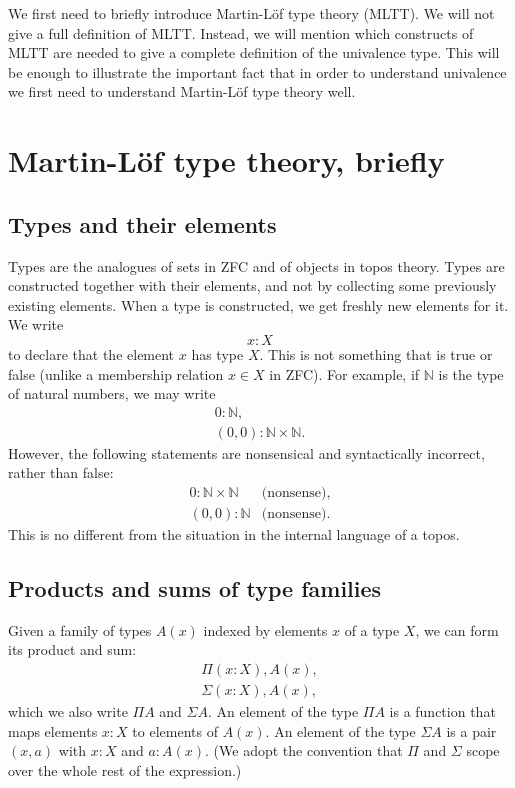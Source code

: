 \documentclass{article}
\newcommand{\N}{\mathbb{N}}
\begin{document}
We first need to briefly introduce Martin-L\"of type theory (MLTT). We
will not give a full definition of MLTT. Instead, we will mention
which constructs of MLTT are needed to give a complete definition of
the univalence type. This will be enough to illustrate the important
fact that in order to understand univalence we first need to
understand Martin-L\"of type theory well.

\section{Martin-L\"of type theory, briefly}

\subsection{Types and their elements}

Types are the analogues of sets in ZFC and of objects in topos theory.
%
Types are constructed together with their elements, and not by
collecting some previously existing elements. When a type is
constructed, we get freshly new elements for it. We write
\[
    x:X
\]
to declare that the element $x$ has type $X$. This is not something
that is true or false (unlike a membership relation $x \in X$ in
ZFC). For example, if $\N$ is the type of natural numbers, we may
write
\begin{gather*}  
    0 : \N, \\
   (0,0) : \N \times  \N.
\end{gather*}
However, the following statements are nonsensical and syntactically
incorrect, rather than false:
\begin{eqnarray*}
    0 : \N \times  \N & \text{(nonsense)}, \\
   (0,0) : \N & \text{(nonsense)}.  
\end{eqnarray*}
This is no different from the situation in the internal language of a
topos.

\subsection{Products and sums of type families}

Given a family of types $A(x)$ indexed by elements $x$ of a type $X$, we can
form its product and sum:
\begin{gather*}
    \Pi(x:X), A(x), \\
    \Sigma(x:X), A(x),  
\end{gather*}
which we also write $\Pi A$ and $\Sigma A$. An element of the type $\Pi A$ is a
function that maps elements $x:X$ to elements of $A(x)$. An element of the
type $\Sigma A$ is a pair $(x,a)$ with $x:X$ and $a:A(x)$.
%
(We adopt the convention that $\Pi$ and $\Sigma$ scope over the whole rest of the
expression.)
\end{document}
